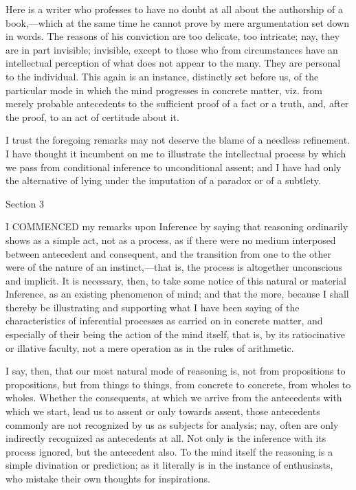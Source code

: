 Here is a writer who professes to have no doubt at all about the
authorship of a book,—which at the same time he cannot prove by mere
argumentation set down in words. The reasons of his conviction are too
delicate, too intricate; nay, they are in part invisible; invisible,
except to those who from circumstances have an intellectual perception
of what does not appear to the many. They are personal to the
individual. This again is an instance, distinctly set before us, of
the particular mode in which the mind progresses in concrete matter,
viz. from merely probable antecedents to the sufficient proof of a
fact or a truth, and, after the proof, to an act of certitude about
it.

I trust the foregoing remarks may not deserve the blame of a
needless refinement. I have thought it incumbent on me to illustrate
the intellectual process by which we pass from conditional inference
to unconditional assent; and I have had only the alternative of lying
under the imputation of a paradox or of a subtlety.

Section 3


I COMMENCED my remarks upon Inference by saying that
reasoning ordinarily shows as a simple act, not as a process, as if
there were no medium interposed between antecedent and consequent, and
the transition from one to the other were of the nature of an
instinct,—that is, the process is altogether unconscious and
implicit. It is necessary, then, to take some notice of this natural
or material Inference, as an existing phenomenon of mind; and that the
more, because I shall thereby be illustrating and supporting what I
have been saying of the characteristics of inferential processes as
carried on in concrete matter, and especially of their being the
action of the mind itself, that is, by its ratiocinative or illative
faculty, not a mere operation as in the rules of arithmetic.

I say, then, that our most natural mode of reasoning is, not from
propositions to propositions, but from things to things, from concrete
to concrete, from wholes to wholes. Whether the consequents, at which
we arrive from the antecedents with which we start, lead us to assent
or only towards assent, those antecedents commonly are not recognized
by us as subjects for analysis; nay, often are only indirectly
recognized as antecedents at all. Not only is the inference with its
process ignored, but the antecedent also. To the mind itself the
reasoning is a simple divination or prediction; as it literally is in
the instance of enthusiasts, who mistake their own thoughts for
inspirations.

